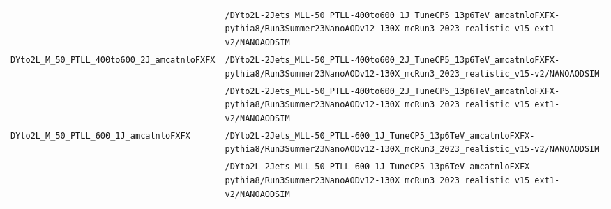 \begin{longtable}{@{}>{\RaggedRight\arraybackslash}p{} >{\RaggedRight\arraybackslash}p{}@{}}
 & \texttt{/\allowbreak{}DYto2L-\allowbreak{}2Jets\_\allowbreak{}MLL-\allowbreak{}50\_\allowbreak{}PTLL-\allowbreak{}400to600\_\allowbreak{}1J\_\allowbreak{}TuneCP5\_\allowbreak{}13p6TeV\_\allowbreak{}amcatnloFXFX-\allowbreak{}pythia8/\allowbreak{}Run3Summer23NanoAODv12-\allowbreak{}130X\_\allowbreak{}mcRun3\_\allowbreak{}2023\_\allowbreak{}realistic\_\allowbreak{}v15\_\allowbreak{}ext1-\allowbreak{}v2/\allowbreak{}NANOAODSIM} \\
\addlinespace[2pt]
\texttt{DYto2L\_\allowbreak{}M\_\allowbreak{}50\_\allowbreak{}PTLL\_\allowbreak{}400to600\_\allowbreak{}2J\_\allowbreak{}amcatnloFXFX} & \texttt{/\allowbreak{}DYto2L-\allowbreak{}2Jets\_\allowbreak{}MLL-\allowbreak{}50\_\allowbreak{}PTLL-\allowbreak{}400to600\_\allowbreak{}2J\_\allowbreak{}TuneCP5\_\allowbreak{}13p6TeV\_\allowbreak{}amcatnloFXFX-\allowbreak{}pythia8/\allowbreak{}Run3Summer23NanoAODv12-\allowbreak{}130X\_\allowbreak{}mcRun3\_\allowbreak{}2023\_\allowbreak{}realistic\_\allowbreak{}v15-\allowbreak{}v2/\allowbreak{}NANOAODSIM} \\
 & \texttt{/\allowbreak{}DYto2L-\allowbreak{}2Jets\_\allowbreak{}MLL-\allowbreak{}50\_\allowbreak{}PTLL-\allowbreak{}400to600\_\allowbreak{}2J\_\allowbreak{}TuneCP5\_\allowbreak{}13p6TeV\_\allowbreak{}amcatnloFXFX-\allowbreak{}pythia8/\allowbreak{}Run3Summer23NanoAODv12-\allowbreak{}130X\_\allowbreak{}mcRun3\_\allowbreak{}2023\_\allowbreak{}realistic\_\allowbreak{}v15\_\allowbreak{}ext1-\allowbreak{}v2/\allowbreak{}NANOAODSIM} \\
\addlinespace[2pt]
\texttt{DYto2L\_\allowbreak{}M\_\allowbreak{}50\_\allowbreak{}PTLL\_\allowbreak{}600\_\allowbreak{}1J\_\allowbreak{}amcatnloFXFX} & \texttt{/\allowbreak{}DYto2L-\allowbreak{}2Jets\_\allowbreak{}MLL-\allowbreak{}50\_\allowbreak{}PTLL-\allowbreak{}600\_\allowbreak{}1J\_\allowbreak{}TuneCP5\_\allowbreak{}13p6TeV\_\allowbreak{}amcatnloFXFX-\allowbreak{}pythia8/\allowbreak{}Run3Summer23NanoAODv12-\allowbreak{}130X\_\allowbreak{}mcRun3\_\allowbreak{}2023\_\allowbreak{}realistic\_\allowbreak{}v15-\allowbreak{}v2/\allowbreak{}NANOAODSIM} \\
 & \texttt{/\allowbreak{}DYto2L-\allowbreak{}2Jets\_\allowbreak{}MLL-\allowbreak{}50\_\allowbreak{}PTLL-\allowbreak{}600\_\allowbreak{}1J\_\allowbreak{}TuneCP5\_\allowbreak{}13p6TeV\_\allowbreak{}amcatnloFXFX-\allowbreak{}pythia8/\allowbreak{}Run3Summer23NanoAODv12-\allowbreak{}130X\_\allowbreak{}mcRun3\_\allowbreak{}2023\_\allowbreak{}realistic\_\allowbreak{}v15\_\allowbreak{}ext1-\allowbreak{}v2/\allowbreak{}NANOAODSIM} \\

\end{longtable}
